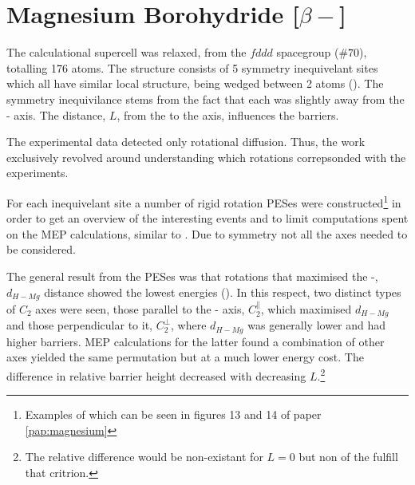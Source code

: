 \section{Magnesium Borohydride [$\beta-$]}
\label{sec:borohydrides-magnesium}


The calculational supercell was relaxed, from the $fddd$ spacegroup ($\#70$), totalling 176 atoms.
The structure consists of 5 symmetry inequivelant  sites which all have similar local structure, being wedged between 2  atoms ().
The symmetry inequivilance stems from the fact that each  was slightly away from the - axis.
The distance, $L$, from the  to the axis, influences the barriers.


The experimental data detected only rotational diffusion.
Thus, the work exclusively revolved around understanding which rotations correpsonded with the experiments.

For each inequivelant site a number of rigid rotation PESes were constructed\footnote{Examples of which can be seen in figures 13 and 14 of paper \ref{pap:magnesium}} in order to get an overview of the interesting events and to limit computations spent on the MEP calculations, similar to .
Due to symmetry not all the axes needed to be considered.

The general result from the PESes was that rotations that maximised the -, $d_{H-Mg}$ distance showed the lowest energies ().
In this respect, two distinct types of $C_2$ axes were seen, those parallel to the - axis, $C_2^\parallel$, which maximised $d_{H-Mg}$ and those perpendicular to it, $C_2^\perp$, where $d_{H-Mg}$ was generally lower and had higher barriers.
MEP calculations for the latter found a combination of other axes yielded the same permutation but at a much lower energy cost.
The difference in relative barrier height decreased with decreasing $L$.\footnote{The relative difference would be non-existant for $L=0$ but non of the  fulfill that critrion.}


